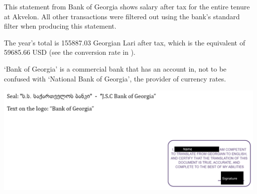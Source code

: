 
This statement from Bank of Georgia shows \mrls salary after tax for the entire tenure at Akvelon.
All other transactions were filtered out using the bank's standard filter when producing this statement.

The year's total is 155887.03 Georgian Lari after tax,
which is the equivalent of 59685.66 USD (see the conversion rate in ).

`Bank of Georgia' is a commercial bank that \mrl has an account in,
not to be confused with `National Bank of Georgia', the provider of currency rates.



\includegraphics[width=\textwidth]{bank-statement_tr_public}

\pagebreak
